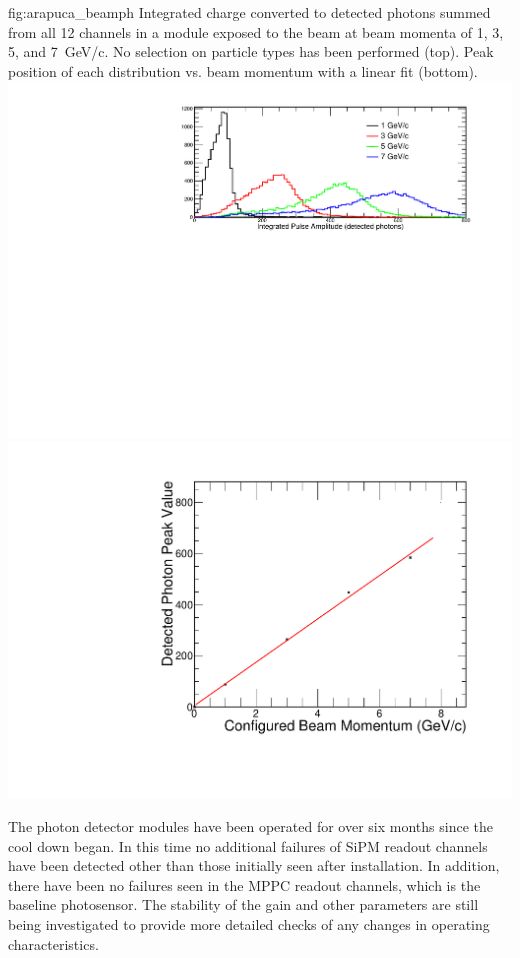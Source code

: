 \begin{dunefigure}{fig:arapuca_beamph}
{Integrated charge converted to detected photons summed from all 12 channels in a   module exposed to the beam at beam momenta of \num{1}, \num{3}, \num{5}, and \SI{7}{GeV/c}. No selection on particle types has been performed (top).  Peak position of each distribution vs. beam momentum with a linear fit (bottom).}
\includegraphics[angle=0,width=0.6\columnwidth]{graphics/pds-Arapuca-summedBeamPH_gain.pdf}
\includegraphics[angle=0,width=0.35\columnwidth,height=0.25\columnwidth]{graphics/pds-Arapuca-PEsummedvsBeam_gain.pdf}
\end{dunefigure}



The  photon detector modules have been operated for over six months since the cool down began.  In this time no additional failures of SiPM readout channels have been detected other than those initially seen after installation.  In addition, there have been no failures seen in the MPPC readout channels, which is the baseline photosensor.  The stability of the gain and other parameters are still being investigated to provide more detailed checks of any changes in operating characteristics.
 
 
 

